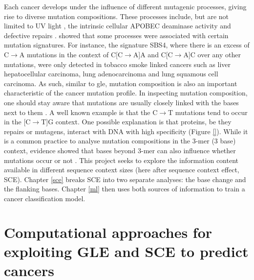 Each cancer develops under the influence of different mutagenic processes, giving rise to diverse mutation compositions. These processes include, but are not limited to UV light \citep[known in skin melanoma;][]{Mohania2017}, the intrinsic cellular APOBEC deaminase activity \citep[\textit{e.g.} in B cells;][]{Kuppers2005MechanismsPathogenesis} and defective repairs \citep[\textit{e.g.} mutated \textit{BRCA} genes in breast cancer;][]{Navasardyan2021YY1TNBC}. \citet{Alexandrov2013, Alexandrov2020} showed that some processes were associated with certain mutation signatures. For instance, the signature SBS4, where there is an excess of C$\rightarrow$A mutations in the context of C[C$\rightarrow$A]A and C[C$\rightarrow$A]C over any other mutations, were only detected in tobacco smoke linked cancers such as liver hepatocellular carcinoma, lung adenocarcinoma and lung squamous cell carcinoma. As such, similar to \gls{gle}, mutation composition is also an important characteristic of the cancer mutation profile. In inspecting mutation composition, one should stay aware that mutations are usually closely linked with the \glspl{base} next to them \citep{Zhu2017}. A well known example is that the C$\rightarrow$T mutations tend to occur in the [C$\rightarrow$T]G context. One possible explanation is that proteins, be they repairs or mutagens, interact with DNA with high specificity (Figure \ref{}). While it is a common practice to analyse mutation compositions in the 3-mer (3 base) context, evidence showed that bases beyond 3-mer can also influence whether mutations occur or not \citep{Zhu2017,Zhu2020}. This project seeks to explore the information content available in different sequence context sizes (here after sequence context effect, SCE). Chapter \ref{sce} breaks SCE into two separate analyses: the base change and the flanking bases. Chapter \ref{ml} then uses both sources of information to train a cancer classification model.  


\section{Computational approaches for exploiting GLE and SCE to predict cancers}
\label{intro:ml}
